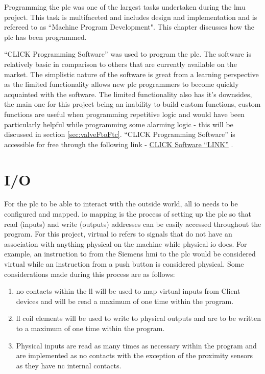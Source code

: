 Programming the \acrshort{plc} was one of the largest tasks undertaken during the \acrshort{lmu} project. This task is multifaceted and includes design and implementation and is refereed to as ``Machine Program Development". This chapter discusses how the \acrshort{plc} has been programmed.

``CLICK Programming Software'' was used to program the \acrshort{plc}. The software is relatively basic in comparison to others that are currently available on the market. The simplistic nature of the software is great from a learning perspective as the limited functionality allows new \acrshort{plc} programmers to become quickly acquainted with the software. The limited functionality also has it's downsides, the main one for this project being an inability to build custom functions, custom functions are useful when programming repetitive logic and would have been particularly helpful while programming some alarming logic - this will be discussed in section \ref{sec:valveFtoFtc}. ``CLICK Programming Software'' is accessible for free through the following link - \href{https://www.automationdirect.com/clickplcs/free-software/free-click-software}{CLICK Software ``LINK''} \cite{clickSoftwareDownload}.

\section{I/O}
    For the \acrshort{plc} to be able to interact with the outside world, all \acrshort{io} needs to be configured and mapped. \acrshort{io} mapping is the process of setting up the \acrshort{plc} so that read (inputs) and write (outputs) addresses can be easily accessed throughout the program. For this project, virtual \acrshort{io} refers to signals that do not have an association with anything physical on the machine while physical \acrshort{io} does. For example, an instruction to from the Siemens \acrshort{hmi} to the \acrshort{plc} would be considered virtual while an instruction from a push button is considered physical. Some considerations made during this process are as follows:
    
    \begin{enumerate}
        \item \acrshort{no} contacts within the \acrshort{ll} will be used to map virtual inputs from Client devices and will be read a maximum of one time within the program.
        \item \acrshort{ll} coil elements will be used to write to physical outputs and are to be written to a maximum of one time within the program. 
        \item Physical inputs are read as many times as necessary within the program and are implemented as \acrshort{no} contacts with the exception of the proximity sensors as they have \acrshort{nc} internal contacts. 
    \end{enumerate}

